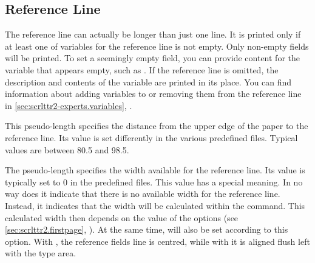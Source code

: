 \subsection{Reference Line}
%
\BeginIndexGroup
{}

The reference line can actually be longer than just one line. It is printed
only if at least one of variables for the reference line is not empty. Only
non-empty fields will be printed. To set a seemingly empty
field, you can provide content for the variable that appears empty, such as
\Parameter{}. If the reference line is omitted, the description
and contents of the  variable are printed in
its place. You can find information about adding variables to or removing them
from the reference line in \autoref{sec:scrlttr2-experts.variables},
.


\begin{Declaration}
\end{Declaration}
This pseudo-length specifies the distance from the upper edge of the paper to
the reference line. Its value is set differently in the various predefined
 files.
Typical values are between 80.5 and 98.5.%
\EndIndexGroup


\begin{Declaration}
\end{Declaration}
The  pseudo-length specifies the width available for the
reference line. Its value is typically set to 0 in the predefined
 files.
This value has a special meaning. In no way does it
indicate that there is no available width for the reference line. Instead, it
indicates that the width will be calculated within the
 command. This calculated
width then depends on the value of the %
%
 options (see
\autoref{sec:scrlttr2.firstpage}, ). At
the same time,  will also be set according to this option.
With %
, the reference fields line is
centred, while with %
 it is aligned flush left with the
type area.

